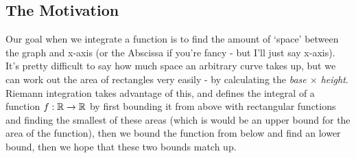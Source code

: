 \subsection{The Motivation}

Our goal when we integrate a function is to find the amount of `space' between the graph and x-axis (or the Abscissa if you're fancy - but I'll just say x-axis). It's pretty difficult to say how much space an arbitrary curve takes up, but we can work out the area of rectangles very easily - by calculating the {\em base $\times$ height}. Riemann integration takes advantage of this, and defines the integral of a function $f:\mathbb{R} \rightarrow \mathbb{R}$ by first bounding it from above with rectangular functions and finding the smallest of these areas (which is would be an upper bound for the area of the function), then we bound the function from below and find an lower bound, then we hope that these two bounds match up. 

